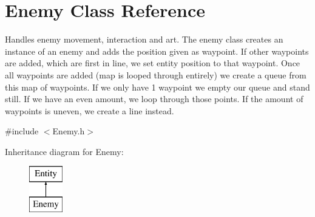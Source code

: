 \hypertarget{class_enemy}{}\section{Enemy Class Reference}
\label{class_enemy}


Handles enemy movement, interaction and art. The enemy class creates an instance of an enemy and adds the position given as waypoint. If other waypoints are added, which are first in line, we set entity position to that waypoint. Once all waypoints are added (map is looped through entirely) we create a queue from this map of waypoints. If we only have 1 waypoint we empty our queue and stand still. If we have an even amount, we loop through those points. If the amount of waypoints is uneven, we create a line instead.  




{\ttfamily \#include $<$Enemy.\+h$>$}

Inheritance diagram for Enemy\+:\begin{figure}[H]
\begin{center}
\leavevmode
\includegraphics[height=2.000000cm]{class_enemy}
\end{center}
\end{figure}
